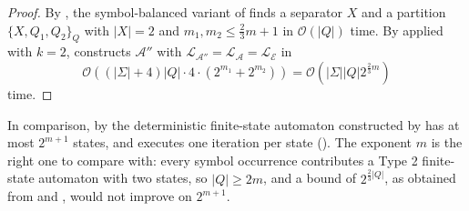   \begin{proof}
    By , the symbol-balanced variant of
     finds a separator $X$ and a partition $\{ X, Q_1, Q_2
    \}_Q$ with $|X| = 2$ and $m_1, m_2 \leq \frac{2}{3} m + 1$ in $\mathcal{O}(|Q|)$
    time. By  applied with $k = 2$,
     constructs $\mathcal{A}''$ with
    $\mathcal{L}_{\mathcal{A}''} = \mathcal{L}_\mathcal{A} = \mathcal{L}_\mathcal{E}$ in
    \begin{equation*}
      \mathcal{O}((|\Sigma| + 4) |Q| \cdot 4 \cdot (2^{m_1} + 2^{m_2})) =
      \mathcal{O}(|\Sigma| |Q| 2^{\frac{2}{3} m})
    \end{equation*}
    time.
  \end{proof}

  In comparison, by  the deterministic
  finite-state automaton constructed by  has at most $2^{m + 1}$
  states, and  executes one iteration per state
  (). The exponent $m$ is the right one to compare
  with: every symbol occurrence contributes a Type 2 finite-state automaton with two
  states, so $|Q| \geq 2m$, and a bound of $2^{\frac{2}{3} |Q|}$, as obtained from
   and , would not improve
  on $2^{m + 1}$.
